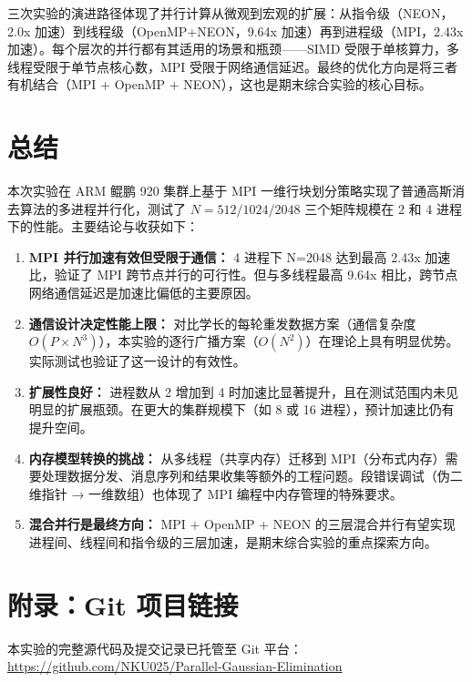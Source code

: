 \documentclass[a4paper]{article}
\begin{document}
三次实验的演进路径体现了并行计算从微观到宏观的扩展：从指令级（NEON，2.0x 加速）到线程级（OpenMP+NEON，9.64x 加速）再到进程级（MPI，2.43x 加速）。每个层次的并行都有其适用的场景和瓶颈——SIMD 受限于单核算力，多线程受限于单节点核心数，MPI 受限于网络通信延迟。最终的优化方向是将三者有机结合（MPI + OpenMP + NEON），这也是期末综合实验的核心目标。

\section{总结}

本次实验在 ARM 鲲鹏 920 集群上基于 MPI 一维行块划分策略实现了普通高斯消去算法的多进程并行化，测试了 $N=512/1024/2048$ 三个矩阵规模在 2 和 4 进程下的性能。主要结论与收获如下：

\begin{enumerate}
    \item \textbf{MPI 并行加速有效但受限于通信：} 4 进程下 N=2048 达到最高 2.43x 加速比，验证了 MPI 跨节点并行的可行性。但与多线程最高 9.64x 相比，跨节点网络通信延迟是加速比偏低的主要原因。
    \item \textbf{通信设计决定性能上限：} 对比学长的每轮重发数据方案（通信复杂度 $O(P \times N^3)$），本实验的逐行广播方案（$O(N^2)$）在理论上具有明显优势。实际测试也验证了这一设计的有效性。
    \item \textbf{扩展性良好：} 进程数从 2 增加到 4 时加速比显著提升，且在测试范围内未见明显的扩展瓶颈。在更大的集群规模下（如 8 或 16 进程），预计加速比仍有提升空间。
    \item \textbf{内存模型转换的挑战：} 从多线程（共享内存）迁移到 MPI（分布式内存）需要处理数据分发、消息序列和结果收集等额外的工程问题。段错误调试（伪二维指针 → 一维数组）也体现了 MPI 编程中内存管理的特殊要求。
    \item \textbf{混合并行是最终方向：} MPI + OpenMP + NEON 的三层混合并行有望实现进程间、线程间和指令级的三层加速，是期末综合实验的重点探索方向。
\end{enumerate}

\newpage
\section*{附录：Git 项目链接}
本实验的完整源代码及提交记录已托管至 Git 平台：\\
\url{https://github.com/NKU025/Parallel-Gaussian-Elimination}
\end{document}

